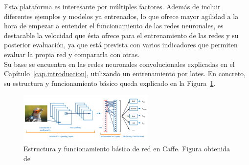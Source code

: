 Esta plataforma es interesante por múltiples factores. Además de incluir diferentes ejemplos y modelos ya entrenados, lo que ofrece mayor agilidad a la hora de empezar a entender el funcionamiento de las redes neuronales, es destacable la velocidad que ésta ofrece para el entrenamiento de las redes y su posterior evaluación, ya que está prevista con varios indicadores que permiten evaluar la propia red y compararla con otras.\\ 

Su base se encuentra en las redes neuronales convolucionales explicadas en el Capítulo~\ref{cap.introduccion}, utilizando un entrenamiento por lotes. En concreto, su estructura y funcionamiento básico queda explicado en la Figura~\ref{fig.redCaffe}.\\

\begin{figure}[H]
	\begin{center}
		\includegraphics[width=0.6\textwidth]{figures/red_caffe}
		\caption{Estructura y funcionamiento básico de red en Caffe. Figura obtenida de~\cite{caffe}}
		\label{fig.redCaffe}
	\end{center}
\end{figure}


